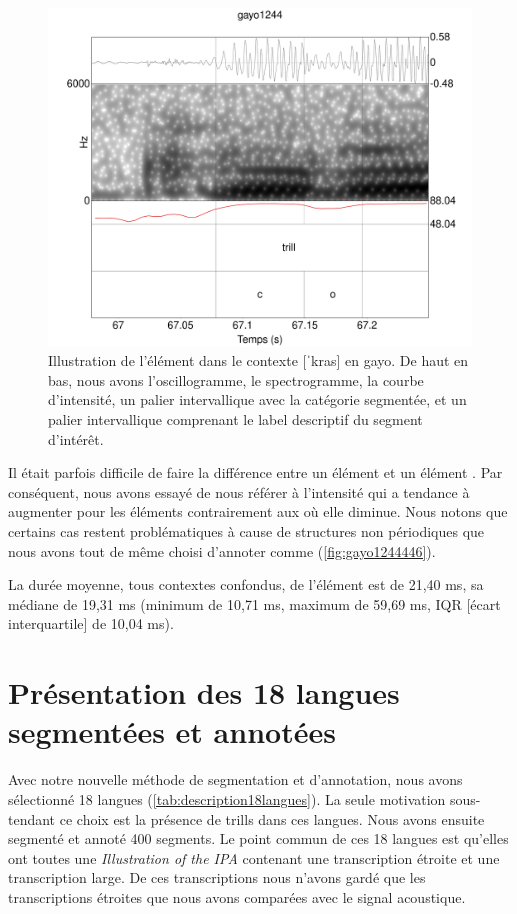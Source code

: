 \begin{figure}
	\centering
	\includegraphics[width=0.8\linewidth]{substance/spectro_images/gayo1244_446_}
	\caption[Illustration de l'élément ]{Illustration de l'élément  dans le contexte [ˈkras] en gayo. De haut en bas, nous avons l'oscillogramme, le spectrogramme, la courbe d'intensité, un palier intervallique avec la catégorie segmentée, et un palier intervallique comprenant le label descriptif du segment d'intérêt.}
	\label{fig:gayo1244446}
\end{figure}

Il était parfois difficile de faire la différence entre un élément  et un élément .
Par conséquent, nous avons essayé de nous référer à l'intensité qui a tendance à augmenter pour les éléments  contrairement aux  où elle diminue. Nous notons que certains cas restent problématiques à cause de structures non périodiques que nous avons tout de même choisi d'annoter comme  (\autoref{fig:gayo1244446}).

La durée moyenne, tous contextes confondus, de l'élément  est de 21,40 ms, sa médiane de 19,31 ms (minimum de 10,71 ms, maximum de 59,69 ms, IQR [écart interquartile] de 10,04 ms).

\section{Présentation des 18 langues segmentées et annotées}

Avec notre nouvelle méthode de segmentation et d'annotation, nous avons sélectionné 18 langues (\autoref{tab:description18langues}). La seule motivation sous-tendant ce choix est la présence de trills dans ces langues. Nous avons ensuite segmenté et annoté 400 segments. Le point commun de ces 18 langues est qu'elles ont toutes une \textit{Illustration of the IPA} contenant une transcription étroite et une transcription large. De ces transcriptions nous n'avons gardé que les transcriptions étroites que nous avons comparées avec le signal acoustique.\\

